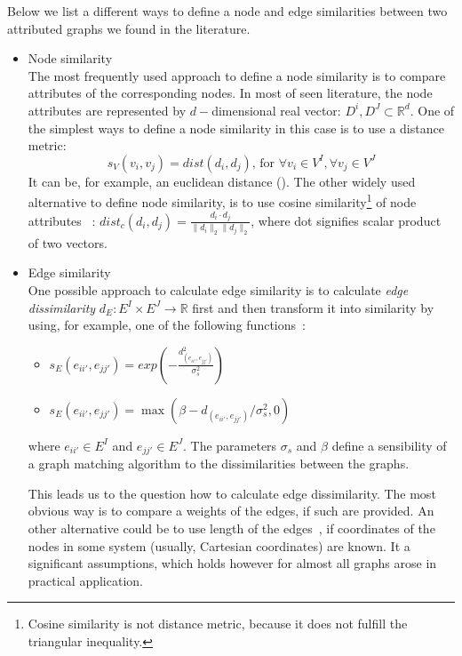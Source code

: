 Below we list a different ways to define a node and edge similarities between two attributed graphs we found in the literature.
\vspace{-5pt}
\begin{itemize}
	\item Node similarity\\
	The most frequently used approach to define a node similarity is to compare attributes of the corresponding nodes. In most of seen literature, the node attributes are represented by $d-$dimensional real vector: $D^i,D^J\subset\mathbb{R}^d$. One of the simplest ways to define a node similarity in this case is to use a distance metric:
	\begin{equation}
	s_V(v_i,v_j) = dist(d_i,d_j)\text{, for }\forall v_i\in V^I,\forall v_j\in V^J
	\end{equation}
	It can be, for example, an euclidean distance %
	(\cite{Cho2010_RRWM}).
	The other widely used alternative to define node similarity, is to use cosine similarity\footnote{Cosine similarity is not distance metric, because it does not fulfill the triangular inequality.} of node attributes ~\cite{CliqueGraph_CVPR2015}: $dist_c(d_i,d_j)=\frac{d_i\cdot d_j}{\|d_i\|_2\|d_j\|_2}$, where dot signifies scalar product of two vectors.
	\vspace{-5pt}
	\item Edge similarity\\
	One possible approach to calculate edge similarity is to calculate \emph{edge dissimilarity} $d_E:E^I\times E^J\rightarrow\mathbb{R}$ first and then transform it into similarity by using, for example, one of the following functions~\cite{Cho2014_Haystack, Cho2009_AgglClustering, Cho2010_RRWM,Cho2012_ProgressiveGM}:
	\begin{itemize}
		\item $s_E(e_{ii\prime}, e_{jj\prime})= exp(-\frac{d_(e_{ii\prime}, e_{jj\prime})^2}{\sigma^2_{s}})$
		\item $s_E(e_{ii\prime}, e_{jj\prime})= \max(\beta - d_(e_{ii\prime}, e_{jj\prime})/\sigma^2_{s},0)$
	\end{itemize}
	where $e_{ii\prime}\in E^I$ and $e_{jj\prime}\in E^J$. The parameters $\sigma_s$ and $\beta$ define a sensibility of a graph matching algorithm to the dissimilarities between the graphs.
	
	This leads us to the question how to calculate edge dissimilarity. The most obvious way is to compare a weights of the edges, if such are provided. An other alternative could be to use length of the edges~\cite{Cho2014_Haystack, Cho2009_AgglClustering, Cho2010_RRWM,Cho2012_ProgressiveGM}, if coordinates of the nodes in some system (usually, Cartesian coordinates) are known. It a significant assumptions, which holds however for almost all graphs arose in practical application.
	

\end{itemize}
